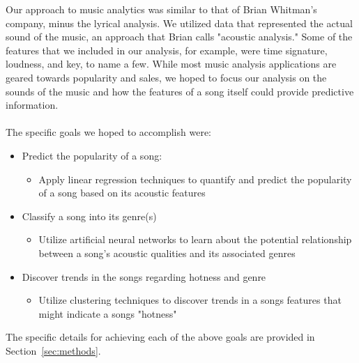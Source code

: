 \documentclass[12pt]{article}
\begin{document}
Our approach to music analytics was similar to that of Brian Whitman's company, minus the lyrical analysis. We utilized data that represented the actual sound of the music, an approach that Brian calls "acoustic analysis." Some of the features that we included in our analysis, for example, were time signature, loudness, and key, to name a few. While most music analysis applications are geared towards popularity and sales, we hoped to focus our analysis on the sounds of the music and how the features of a song itself could provide predictive information.
\\
\\
The specific goals we hoped to accomplish were:
\begin{itemize}
    \item Predict the popularity of a song:
    \vspace{-3.5mm}
    \begin{itemize}
        \item Apply linear regression techniques to quantify and predict the popularity of a song based on its acoustic features
        \vspace{-3.5mm}
    \end{itemize}
    \item Classify a song into its genre(s)
    \vspace{-3.5mm}
    \begin{itemize}
        \item Utilize artificial neural networks to learn about the potential relationship between a song's acoustic qualities and its associated genres 
        \vspace{-3.5mm}
    \end{itemize}
    \item Discover trends in the songs regarding hotness and genre
    \vspace{-3.5mm}
    \begin{itemize}
        \item Utilize clustering techniques to discover trends in a songs features that might indicate a songs "hotness"
    \end{itemize}
\end{itemize}

The specific details for achieving each of the above goals are provided in Section~\ref{sec:methods}. 
\end{document}

